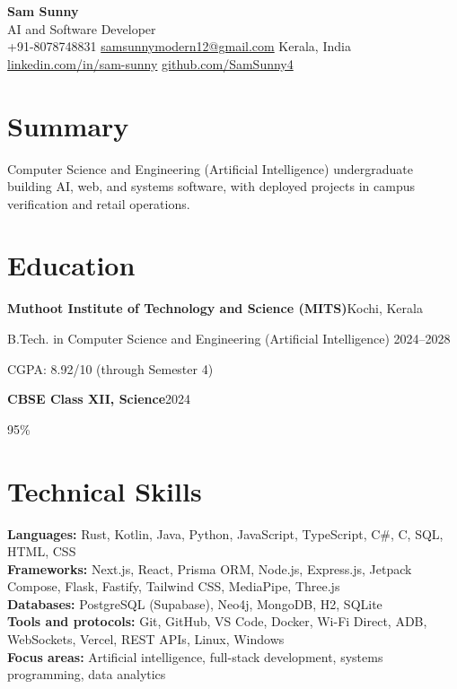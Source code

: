 \documentclass[a4paper,10pt]{article}
\newcommand{\entry}[2]{%
  \noindent\textbf{#1}\hfill{\small #2}\par
}
\begin{document}
\begin{center}
  {\LARGE\textbf{Sam Sunny}}\\[3pt]
  {\small AI and Software Developer}\\[4pt]
  {\small
    +91-8078748831 \textbar{}
    \href{mailto:samsunnymodern12@gmail.com}{samsunnymodern12@gmail.com} \textbar{}
    Kerala, India\\[2pt]
    \href{https://www.linkedin.com/in/sam-sunny-36b4772bb/}{linkedin.com/in/sam-sunny} \textbar{}
    \href{https://github.com/SamSunny4}{github.com/SamSunny4}
  }
\end{center}
\vspace{-7pt}

\section{Summary}
Computer Science and Engineering (Artificial Intelligence) undergraduate building AI, web, and systems software, with deployed projects in campus verification and retail operations.

\section{Education}
\entry{Muthoot Institute of Technology and Science (MITS)}{Kochi, Kerala}
{B.Tech. in Computer Science and Engineering (Artificial Intelligence) \hfill 2024--2028}\par
{CGPA: 8.92/10 (through Semester 4)}\par
\entry{CBSE Class XII, Science}{2024}
{95\%}\par

\section{Technical Skills}
\small
\textbf{Languages:} Rust, Kotlin, Java, Python, JavaScript, TypeScript, C\#, C, SQL, HTML, CSS\\
\textbf{Frameworks:} Next.js, React, Prisma ORM, Node.js, Express.js, Jetpack Compose, Flask, Fastify, Tailwind CSS, MediaPipe, Three.js\\
\textbf{Databases:} PostgreSQL (Supabase), Neo4j, MongoDB, H2, SQLite\\
\textbf{Tools and protocols:} Git, GitHub, VS Code, Docker, Wi-Fi Direct, ADB, WebSockets, Vercel, REST APIs, Linux, Windows\\
\textbf{Focus areas:} Artificial intelligence, full-stack development, systems programming, data analytics
\normalsize
\end{document}
